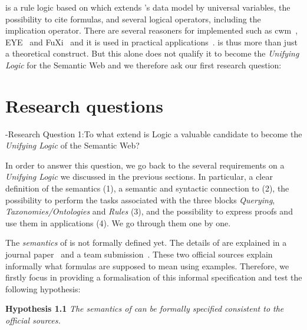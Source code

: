 \nthreelogic is a rule logic based on \rdf which extends \rdf's data model by universal variables, the possibility to cite formulas, and  several logical operators, 
including the implication operator. %
There are several reasoners for \nthreelogic implemented such as cwm~\cite{cwm}, EYE~\cite{eye} and FuXi~\cite{fuxi} and it is used in practical applications~\cite{eyepaper}. 
\nthreelogic is thus more than just a theoretical construct. But this alone does not qualify it to become the \emph{Unifying Logic}
for the Semantic Web and we therefore ask our first research question:

\label{prefixremark}

\section{Research questions}



\hyp{Research Question 1:}{To what extend is \nthree Logic a valuable candidate to become the \emph{Unifying Logic} of the Semantic Web?}

In order to answer this question, we go back to the several requirements on a \emph{Unifying Logic} we discussed in the previous sections. 
In particular,
a clear definition of the semantics (1), a semantic and syntactic connection to \rdf (2), the possibility to perform the tasks associated with 
the three blocks \emph{Querying}, \emph{Taxonomies/Ontologies}
and \emph{Rules} (3), and the possibility to express proofs and use them in applications (4). We go through them one by one.

The \emph{semantics} of \nthree is not formally defined yet. The details of \nthreelogic 
are explained in a journal paper~\cite{N3Logic} and a \wwwc team submission~\cite{Notation3}. 
These two official sources explain informally what \nthree formulas are supposed to mean using examples.  Therefore, we firstly focus in providing a formalisation of this informal specification and test the following hypothesis:

\textbf{Hypothesis 1.1} \textit{The semantics of  \nthreelogic can be formally specified consistent to the official sources.}

